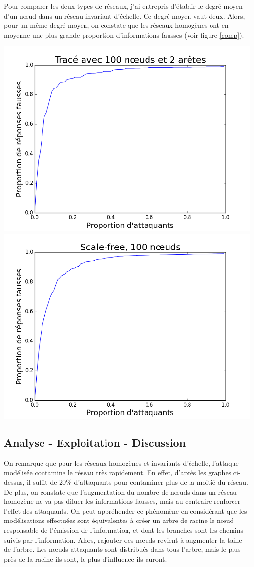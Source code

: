 \documentclass[12pt,a4paper]{article}
\begin{document}
Pour comparer les deux types de réseaux, j'ai entrepris d'établir le degré moyen d'un nœud dans un réseau invariant d'échelle.
Ce degré moyen vaut deux.
Alors, pour un même degré moyen, on constate que les réseaux homogènes ont en moyenne une plus grande proportion d'informations fausses (voir figure \ref{comp}).


\begin{center}
\includegraphics[width=0.49\linewidth]{../resultats/atkaleat/atkaleat-100-2-1.png}
\includegraphics[width=0.49\linewidth]{../resultats/scale-free/sf-t1-n100-1-it100.png}
 \label{comp}
\end{center}
	



\subsection{Analyse - Exploitation - Discussion} %

On remarque que pour les réseaux homogènes et invariants d'échelle, l'attaque modélisée contamine le réseau très rapidement.
En effet, d'après les graphes ci-dessus, il suffit de 20\% d'attaquants pour contaminer plus de la moitié du réseau.
De plus, on constate que l'augmentation du nombre de nœuds dans un réseau homogène ne va pas diluer les informations fausses, mais au contraire renforcer l'effet des attaquants.
On peut appréhender ce phénomène en considérant que les modélisations effectuées sont équivalentes à créer un arbre de racine le nœud responsable de l'émission de l'information, et dont les branches sont les chemins suivis par l'information.
Alors, rajouter des nœuds revient à augmenter la taille de l'arbre.
Les nœuds attaquants sont distribués dans tous l'arbre, mais le plus près de la racine ils sont, le plus d'influence ils auront.
\end{document}
